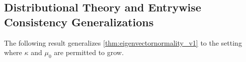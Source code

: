 \documentclass[10pt]{article}
\newcommand{\0}{{\mathbf{0}}}
\newcommand{\1}{{\mathbf{1}}}
\newcommand{\U}{{\mathbf{U}}}
\renewcommand{\t}{^{\top}}
\newcommand{\uhat}{\mathbf{\hat{U}}}
\newcommand{\p}{\mathbb{P}}
\newcommand{\inv}{^{-1}}
\renewcommand{\hat}{\widehat}
\renewcommand{\hat}{\widehat}
\begin{document}
\subsection{Distributional Theory and Entrywise Consistency Generalizations} \label{sec:generaldistributionaltheory}

The following result generalizes \cref{thm:eigenvectornormality_v1} to the setting where $\kappa$ and $\mu_0$ are permitted to grow. 

\end{document}
